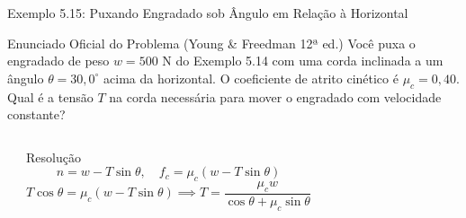 \documentclass[10pt,aspectratio=169]{beamer}
\begin{document}
\begin{frame}{Exemplo 5.15: Puxando Engradado sob Ângulo em Relação à Horizontal}
    \begin{block}{Enunciado Oficial do Problema (Young \& Freedman 12ª ed.)}
        \small
        Você puxa o engradado de peso $w = 500\text{ N}$ do Exemplo 5.14 com uma corda inclinada a um ângulo $\theta = 30{,}0^\circ$ acima da horizontal. O coeficiente de atrito cinético é $\mu_c = 0{,}40$. Qual é a tensão $T$ na corda necessária para mover o engradado com velocidade constante?
    \end{block}
    \begin{columns}[T]
        \begin{center}
        \end{center}
        \begin{exampleblock}{Resolução}
            \small
            $$n = w - T \sin\theta, \quad f_c = \mu_c(w - T \sin\theta)$$
            $$T \cos\theta = \mu_c(w - T \sin\theta) \implies T = \frac{\mu_c w}{\cos\theta + \mu_c \sin\theta}$$
        \end{exampleblock}
    \end{columns}
\end{frame}
\end{document}

